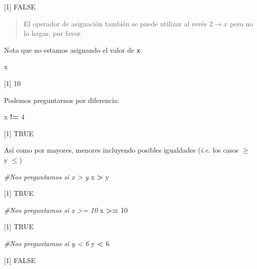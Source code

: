 \documentclass[
]{book}
\newenvironment{Shaded}{\begin{snugshade}}{\end{snugshade}}
\newcommand{\CommentTok}[1]{\textcolor[rgb]{0.56,0.35,0.01}{\textit{#1}}}
\newcommand{\DecValTok}[1]{\textcolor[rgb]{0.00,0.00,0.81}{#1}}
\newcommand{\NormalTok}[1]{#1}
\newcommand{\OperatorTok}[1]{\textcolor[rgb]{0.81,0.36,0.00}{\textbf{#1}}}
\newcommand{\StringTok}[1]{\textcolor[rgb]{0.31,0.60,0.02}{#1}}
\begin{document}
{[}1{]} FALSE

\begin{quote}
El operador de asignación también se puede utilizar al revés \(2 \rightarrow x\) pero no lo hagas, por favor.
\end{quote}

Nota que no estamos asignando el valor de \texttt{x}:

\begin{Shaded}
\begin{Highlighting}[]
\NormalTok{x}
\end{Highlighting}
\end{Shaded}

{[}1{]} 10

Podemos preguntarnos por diferencia:

\begin{Shaded}
\begin{Highlighting}[]
\NormalTok{x }\OperatorTok{!=}\StringTok{ }\DecValTok{4} 
\end{Highlighting}
\end{Shaded}

{[}1{]} TRUE

Así como por mayores, menores incluyendo posibles igualdades (\emph{i.e.} los casos \(\geq\) y \(\leq\))

\begin{Shaded}
\begin{Highlighting}[]
\CommentTok{#Nos preguntamos si x > y}
\NormalTok{x }\OperatorTok{>}\StringTok{ }\NormalTok{y}
\end{Highlighting}
\end{Shaded}

{[}1{]} TRUE

\begin{Shaded}
\begin{Highlighting}[]
\CommentTok{#Nos preguntamos si x >= 10}
\NormalTok{x }\OperatorTok{>=}\StringTok{ }\DecValTok{10}
\end{Highlighting}
\end{Shaded}

{[}1{]} TRUE

\begin{Shaded}
\begin{Highlighting}[]
\CommentTok{#Nos preguntamos si y < 6}
\NormalTok{y }\OperatorTok{<}\StringTok{ }\DecValTok{6}
\end{Highlighting}
\end{Shaded}

{[}1{]} FALSE
\end{document}
